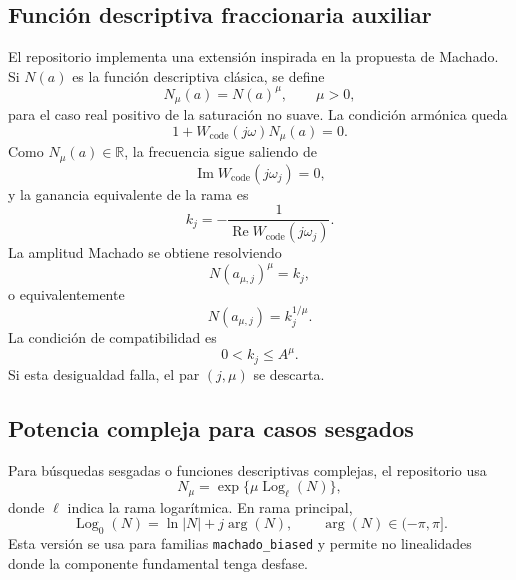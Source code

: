 \documentclass[11pt]{article}
\newcommand{\R}{\mathbb{R}}
\newcommand{\Log}{\operatorname{Log}}
\begin{document}
\subsection{Función descriptiva fraccionaria auxiliar}

El repositorio implementa una extensión inspirada en la propuesta de Machado. Si \(N(a)\) es la función descriptiva clásica, se define
\begin{equation}
N_\mu(a)=N(a)^\mu,
\qquad \mu>0,
\label{eq:machado_real}
\end{equation}
para el caso real positivo de la saturación no suave. La condición armónica queda
\begin{equation}
1+W_{\mathrm{code}}(j\omega)N_\mu(a)=0.
\label{eq:machado_closure}
\end{equation}
Como \(N_\mu(a)\in\R\), la frecuencia sigue saliendo de
\begin{equation}
\operatorname{Im} W_{\mathrm{code}}(j\omega_j)=0,
\end{equation}
y la ganancia equivalente de la rama es
\begin{equation}
k_j=-\frac{1}{\operatorname{Re}W_{\mathrm{code}}(j\omega_j)}.
\end{equation}
La amplitud Machado se obtiene resolviendo
\begin{equation}
N(a_{\mu,j})^\mu=k_j,
\end{equation}
o equivalentemente
\begin{equation}
N(a_{\mu,j})=k_j^{1/\mu}.
\label{eq:machado_amp}
\end{equation}
La condición de compatibilidad es
\begin{equation}
0<k_j\leq A^\mu.
\label{eq:machado_compatibility}
\end{equation}
Si esta desigualdad falla, el par \((j,\mu)\) se descarta.

\subsection{Potencia compleja para casos sesgados}

Para búsquedas sesgadas o funciones descriptivas complejas, el repositorio usa
\begin{equation}
N_\mu=\exp\{\mu\Log_\ell(N)\},
\label{eq:machado_complex}
\end{equation}
donde \(\ell\) indica la rama logarítmica. En rama principal,
\begin{equation}
\Log_0(N)=\ln|N|+j\arg(N),
\qquad \arg(N)\in(-\pi,\pi].
\end{equation}
Esta versión se usa para familias \texttt{machado\_biased} y permite no linealidades donde la componente fundamental tenga desfase.
\end{document}
